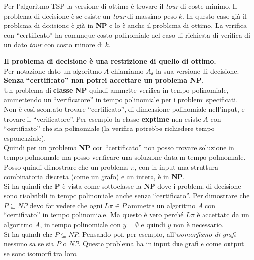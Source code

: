 \documentclass[a4paper,12pt, oneside]{book}
\begin{document}
\begin{esempio}
  Per l'algoritmo TSP la versione di ottimo è trovare il \emph{tour} di costo
  minimo. Il problema di decisione è se esiste un \emph{tour} di massimo peso
  $k$. In questo caso già il problema di decisione è già in \textbf{NP} e lo è
  anche il problema di ottimo. La verifica con ``certificato'' ha comunque costo
  polinomiale nel caso di richiesta di verifica di un dato \emph{tour} con costo
  minore di $k$. 
\end{esempio}
\textbf{Il problema di decisione è una restrizione di quello di ottimo.}\\
Per notazione dato un algoritmo $A$ chiamiamo $A_d$ la sua versione di
decisione.\\

\textbf{Senza ``certificato'' non potrei accettare un problema NP}.\\
Un problema di \textbf{classe NP} quindi ammette verifica in tempo polinomiale,
ammettendo un ``verificatore'' in tempo polinomiale per i problemi
specificati.\\
Non è così scontato trovare ``certificato'', di dimensione polinomiale
nell'input, e trovare il ``verificatore''. Per esempio la classe
\textbf{exptime} non esiste $A$ con ``certificato'' che sia polinomiale (la
verifica potrebbe richiedere tempo esponenziale).\\
Quindi per un problema \textbf{NP} con ``certificato'' non posso trovare
soluzione in tempo polinomiale ma posso verificare una soluzione data in tempo
polinomiale.\\
Posso quindi dimostrare che un problema $\pi$, con in input una struttura
combinatoria discreta (come un grafo) e un intero, è in \textbf{NP}.\\
Si ha quindi che \textbf{P} è vista come sottoclasse la \textbf{NP} dove i
problemi di decisione sono risolvibili in tempo polinomiale anche senza
``certificato''. Per dimostrare che $P\subseteq NP$ devo far vedere che ogni
$L\pi\in P$ ammette un algoritmo $A$ con ``certificato'' in tempo
polinomiale. Ma questo è vero perché $L\pi$ è accettato da un algoritmo $A$, in
tempo polinomiale con $y=\emptyset$ e quindi $y$ non è necessario.\\
Si ha quindi che $P\subseteq NP$. Pensando poi, per esempio,
all'\textit{isomorfismo di grafi} nessuno sa se sia $P$ o $NP$. Questo
problema ha in input due grafi e come output se sono isomorfi tra loro.
\end{document}
